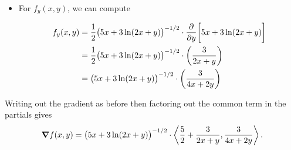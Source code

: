 \documentclass[noauthor,handout]{ximera}
\begin{document}
\begin{problem}
\begin{freeResponse}
\begin{itemize}
\item For $f_y(x,y)$, we can compute

\begin{align*}
f_y(x,y) &= \frac{1}{2}\big( 5x+3\ln(2x+y) \big)^{-1/2} \cdot \frac{\partial }{\partial y} \bigg[ 5x+3\ln(2x+y)\bigg] \\
&= \frac{1}{2}\big( 5x+3\ln(2x+y) \big)^{-1/2} \cdot \left(\frac{3}{2x+y}\right) \\
&= \big( 5x+3\ln(2x+y) \big)^{-1/2} \cdot \left(\frac{3}{4x+2y}\right) \\
\end{align*}
 
\end{itemize}

Writing out the gradient as before then factoring out the common term in the partials gives
\[
\boldsymbol\nabla{f}(x,y) =\big( 5x+3\ln(2x+y) \big)^{-1/2}\cdot \left\langle  \frac{5}{2}+\frac{3}{2x+y}, \frac{3}{4x+2y}\right\rangle.
\]

\end{freeResponse}
\end{problem}

\end{document}
